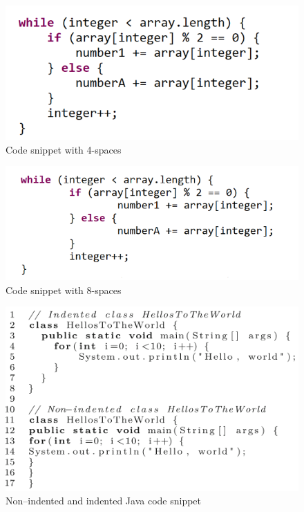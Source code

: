 \begin{figure} [H]
  \centering
  \includegraphics [scale=0.9]
  {figures/4.png}
  \caption{Code snippet with 4-spaces \cite[p. 14]{bauer2017indentations}}
  \label{fig:AnhangsChor}
\end{figure}

\begin{figure} [H]
  \centering
  \includegraphics [scale=1]
  {figures/8.png}
  \caption{Code snippet with 8-spaces \cite[p. 14]{bauer2017indentations}}
  \label{fig:AnhangsChor}
\end{figure}


\begin{figure} [H]
  \centering
  \includegraphics [scale=0.8]
  {figures/indentation_ex.png}
  \caption{Non–indented and indented Java code snippet \cite[p. 4]{hanenberg2024indentation}} 
  \label{fig:AnhangsChor}
\end{figure}

